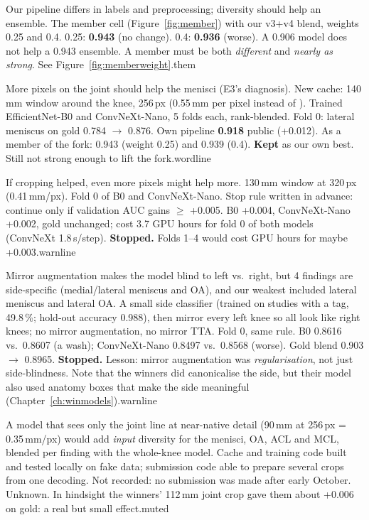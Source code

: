   {Our pipeline differs in labels and preprocessing; diversity should help an ensemble.}
  {The member cell (Figure~\ref{fig:member}) with our v3+v4 blend, weights 0.25 and 0.4.}
  {0.25: \textbf{0.943} (no change). 0.4: \textbf{0.936} (worse).}
  {A 0.906 model does not help a 0.943 ensemble. A member must be both \emph{different} and \emph{nearly as strong}.
   See Figure~\ref{fig:memberweight}.}{them}

  {More pixels on the joint should help the menisci (E3's diagnosis).}
  {New cache: 140\,mm window around the knee, 256\,px (0.55\,mm per pixel instead of ). Trained EfficientNet-B0
   and ConvNeXt-Nano, 5 folds each, rank-blended.}
  {Fold 0: lateral meniscus on gold 0.784 $\rightarrow$ 0.876. Own pipeline \textbf{0.918} public (+0.012). As a member of
   the fork: 0.943 (weight 0.25) and 0.939 (0.4).}
  {\textbf{Kept} as our own best. Still not strong enough to lift the fork.}{wordline}

  {If cropping helped, even more pixels might help more.}
  {130\,mm window at 320\,px (0.41\,mm/px). Fold 0 of B0 and ConvNeXt-Nano. Stop rule written in advance: continue
   only if validation AUC gains $\geq$ +0.005.}
  {B0 +0.004, ConvNeXt-Nano +0.002, gold unchanged; cost 3.7 GPU hours for fold 0 of both models (ConvNeXt 1.8\,s/step).}
  {\textbf{Stopped.} Folds 1--4 would cost  GPU hours for maybe +0.003.}{warnline}

  {Mirror augmentation makes the model blind to left vs.\ right, but 4 findings are side-specific (medial/lateral
   meniscus and OA), and our weakest included lateral meniscus and lateral OA.}
  {A small side classifier (trained on studies with a  tag, 49.8\,\%; hold-out accuracy 0.988), then
   mirror every left knee so all look like right knees; no mirror augmentation, no mirror TTA. Fold 0, same rule.}
  {B0 0.8616 vs.\ 0.8607 (a wash); ConvNeXt-Nano 0.8497 vs.\ 0.8568 (worse). Gold blend 0.903 $\rightarrow$ 0.8965.}
  {\textbf{Stopped.} Lesson: mirror augmentation was \emph{regularisation}, not just side-blindness. Note that the
   winners did canonicalise the side, but their model also used anatomy boxes that make the side meaningful
   (Chapter~\ref{ch:winmodels}).}{warnline}

  {A model that sees only the joint line at near-native detail (90\,mm at 256\,px = 0.35\,mm/px) would add
   \emph{input} diversity for the menisci, OA, ACL and MCL, blended per finding with the whole-knee model.}
  {Cache and training code built and tested locally on fake data; submission code able to prepare several crops from
   one decoding.}
  {Not recorded: no submission was made after early October.}
  {Unknown. In hindsight the winners' 112\,mm joint crop gave them about +0.006 on gold: a real but small effect.}{muted}

